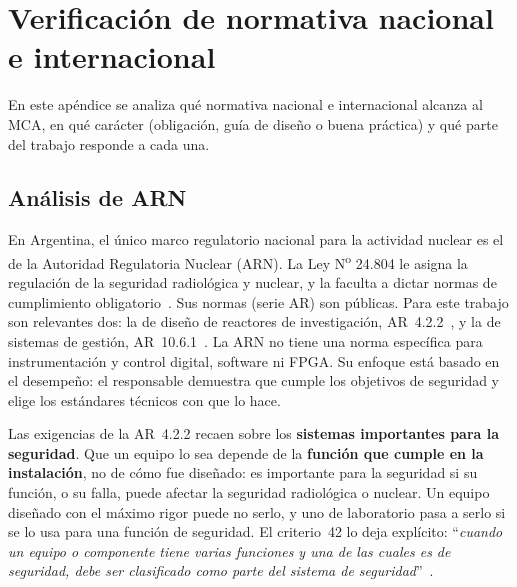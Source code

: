 \chapter{Verificación de normativa nacional e internacional}
\label{C:normativa}

\graphicspath{{figs/cap4/}{figs/comunes/}}

\begin{destacado}
En este apéndice se analiza qué normativa nacional e internacional alcanza al
MCA, en qué carácter (obligación, guía de diseño o buena práctica) y qué parte
del trabajo responde a cada una.
\end{destacado}

\section{Análisis de ARN}
\label{S:norm-arn}

En Argentina, el único marco regulatorio nacional para la actividad nuclear es
el de la Autoridad Regulatoria Nuclear (ARN). La Ley N\textsuperscript{o} 24.804
le asigna la regulación de la seguridad radiológica y nuclear, y la faculta a
dictar normas de cumplimiento obligatorio~\cite{Ley24804}. Sus normas (serie AR)
son públicas. Para este trabajo son relevantes dos: la de diseño de reactores de
investigación, AR~4.2.2~\cite{ARN_AR422}, y la de sistemas de gestión,
AR~10.6.1~\cite{ARN_AR1061}. La ARN no tiene una norma específica para
instrumentación y control digital, software ni FPGA. Su enfoque está basado en
el desempeño: el responsable demuestra que cumple los objetivos de seguridad y
elige los estándares técnicos con que lo hace.

Las exigencias de la AR~4.2.2 recaen sobre los \textbf{sistemas importantes para
la seguridad}. Que un equipo lo sea depende de la \textbf{función que cumple en
la instalación}, no de cómo fue diseñado: es importante para la seguridad si su
función, o su falla, puede afectar la seguridad radiológica o nuclear. Un equipo
diseñado con el máximo rigor puede no serlo, y uno de laboratorio pasa a serlo
si se lo usa para una función de seguridad. El criterio~42 lo deja explícito:
``\emph{cuando un equipo o componente tiene varias funciones y una de las cuales
es de seguridad, debe ser clasificado como parte del sistema de
seguridad}''~\cite{ARN_AR422}.


